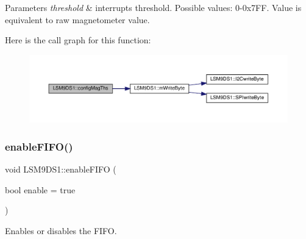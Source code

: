 \begin{DoxyParams}{Parameters}
{\em threshold} & interrupts threshold. Possible values\+: 0-\/0x7\+FF. Value is equivalent to raw magnetometer value. \\
\hline
\end{DoxyParams}
Here is the call graph for this function\+:
\nopagebreak
\begin{figure}[H]
\begin{center}
\leavevmode
\includegraphics[width=350pt]{classLSM9DS1_a87cf3dd3a4d9ca79106eb7c1c866a224_cgraph}
\end{center}
\end{figure}
\mbox{\label{classLSM9DS1_a5f01141131318697838f15d7e5d10f2c}} 
\subsubsection{\texorpdfstring{enable\+F\+I\+F\+O()}{enableFIFO()}}
{\footnotesize\ttfamily void L\+S\+M9\+D\+S1\+::enable\+F\+I\+FO (\begin{DoxyParamCaption}\item[{bool}]{enable = {\ttfamily true} }\end{DoxyParamCaption})}



Enables or disables the F\+I\+FO. 


